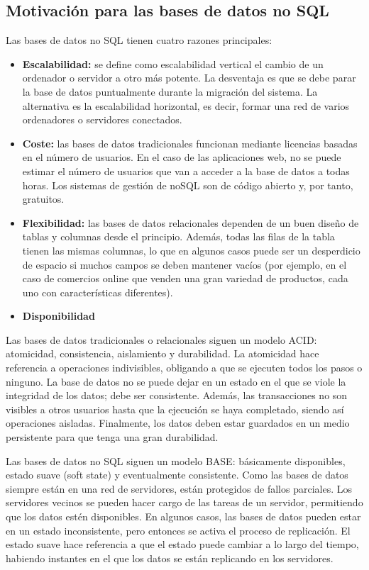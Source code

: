 \subsection{Motivación para las bases de datos no SQL}
Las bases de datos no SQL tienen cuatro razones principales:
\begin{itemize}
\item \textbf{Escalabilidad:} se define como escalabilidad vertical el cambio de un ordenador o servidor a otro más potente. La desventaja es que se debe parar la base de datos puntualmente durante la migración del sistema. La alternativa es la escalabilidad horizontal, es decir, formar una red de varios ordenadores o servidores conectados.
\item \textbf{Coste:} las bases de datos tradicionales funcionan mediante licencias basadas en el número de usuarios. En el caso de las aplicaciones web, no se puede estimar el número de usuarios que van a acceder a la base de datos a todas horas. Los sistemas de gestión de noSQL son de código abierto y, por tanto, gratuitos.
\item \textbf{Flexibilidad:} las bases de datos relacionales dependen de un buen diseño de tablas y columnas desde el principio. Además, todas las filas de la tabla tienen las mismas columnas, lo que en algunos casos puede ser un desperdicio de espacio si muchos campos se deben mantener vacíos (por ejemplo, en el caso de comercios online que venden una gran variedad de productos, cada uno con características diferentes).
\item \textbf{Disponibilidad}
\end{itemize}

Las bases de datos tradicionales o relacionales siguen un modelo ACID: atomicidad, consistencia, aislamiento y durabilidad. La atomicidad hace referencia a operaciones indivisibles, obligando a que se ejecuten todos los pasos o ninguno. La base de datos no se puede dejar en un estado en el que se viole la integridad de los datos; debe ser consistente. Además, las transacciones no son visibles a otros usuarios hasta que la ejecución se haya completado, siendo así operaciones aisladas. Finalmente, los datos deben estar guardados en un medio persistente para que tenga una gran durabilidad. 

Las bases de datos no SQL siguen un modelo BASE: básicamente disponibles, estado suave (soft state) y eventualmente consistente. Como las bases de datos siempre están en una red de servidores, están protegidos de fallos parciales. Los servidores vecinos se pueden hacer cargo de las tareas de un servidor, permitiendo que los datos estén disponibles. En algunos casos, las bases de datos pueden estar en un estado inconsistente, pero entonces se activa el proceso de replicación. El estado suave hace referencia a que el estado puede cambiar a lo largo del tiempo, habiendo instantes en el que los datos se están replicando en los servidores.

